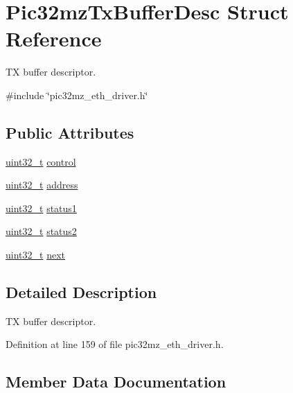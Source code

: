 \hypertarget{structPic32mzTxBufferDesc}{}\section{Pic32mz\+Tx\+Buffer\+Desc Struct Reference}
\label{structPic32mzTxBufferDesc}


TX buffer descriptor.  




{\ttfamily \#include \char`\"{}pic32mz\+\_\+eth\+\_\+driver.\+h\char`\"{}}

\subsection*{Public Attributes}
\begin{DoxyCompactItemize}
\item 
\hyperlink{stdint_8h_a435d1572bf3f880d55459d9805097f62}{uint32\+\_\+t} \hyperlink{structPic32mzTxBufferDesc_abcb8135aadb503621ad36e2caf44739d}{control}
\item 
\hyperlink{stdint_8h_a435d1572bf3f880d55459d9805097f62}{uint32\+\_\+t} \hyperlink{structPic32mzTxBufferDesc_a871be0effc55fb3015607af662aec31d}{address}
\item 
\hyperlink{stdint_8h_a435d1572bf3f880d55459d9805097f62}{uint32\+\_\+t} \hyperlink{structPic32mzTxBufferDesc_a8e5fb7f2100ac5107e55b6658136f2c5}{status1}
\item 
\hyperlink{stdint_8h_a435d1572bf3f880d55459d9805097f62}{uint32\+\_\+t} \hyperlink{structPic32mzTxBufferDesc_a7f506326e97225e3c6a3d58a34fe12e2}{status2}
\item 
\hyperlink{stdint_8h_a435d1572bf3f880d55459d9805097f62}{uint32\+\_\+t} \hyperlink{structPic32mzTxBufferDesc_a599f7ed90daa9438a6e9156951d444ef}{next}
\end{DoxyCompactItemize}


\subsection{Detailed Description}
TX buffer descriptor. 

Definition at line 159 of file pic32mz\+\_\+eth\+\_\+driver.\+h.



\subsection{Member Data Documentation}
\mbox{\label{structPic32mzTxBufferDesc_a871be0effc55fb3015607af662aec31d}} 
